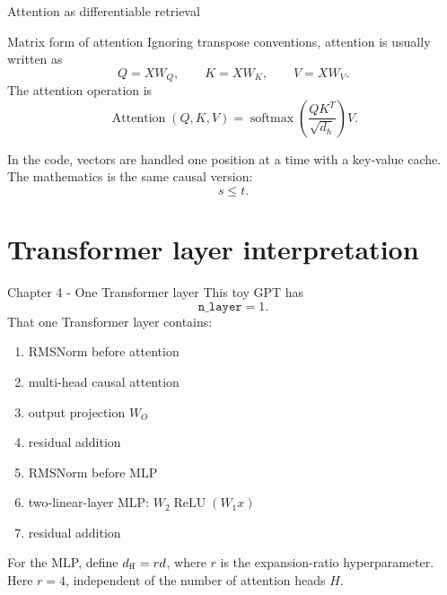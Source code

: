 \documentclass[
  xcolor={svgnames,dvipsnames},
  hyperref={pagebackref,bookmarks},
  aspectratio=169,
  11pt
]{beamer}
\begin{document}
\begin{frame}{Attention as differentiable retrieval}
\centering
{}
\end{frame}

\begin{frame}{Matrix form of attention}
Ignoring transpose conventions, attention is usually written as
\[
Q=XW_Q,\qquad K=XW_K,\qquad V=XW_V.
\]
The attention operation is
\[
\operatorname{Attention}(Q,K,V)
=
\operatorname{softmax}\left(\frac{QK^T}{\sqrt{d_h}}\right)V.
\]

\vspace{0.3cm}
In the code, vectors are handled one position at a time with a key-value cache. The mathematics is the same causal version:
\[
s\le t.
\]
\end{frame}

\section{Transformer layer interpretation}
\begin{frame}{Chapter 4 - One Transformer layer}
This toy GPT has
\[
\texttt{n\_layer}=1.
\]
That one Transformer layer contains:
\begin{enumerate}
  \item RMSNorm before attention
  \item multi-head causal attention
  \item output projection $W_O$
  \item residual addition
  \item RMSNorm before MLP
  \item two-linear-layer MLP: $W_2\operatorname{ReLU}(W_1x)$
  \item residual addition
\end{enumerate}
For the MLP, define $d_{\rm ff}=rd$, where $r$ is the expansion-ratio hyperparameter. Here $r=4$, independent of the number of attention heads $H$.
\end{frame}
\end{document}
